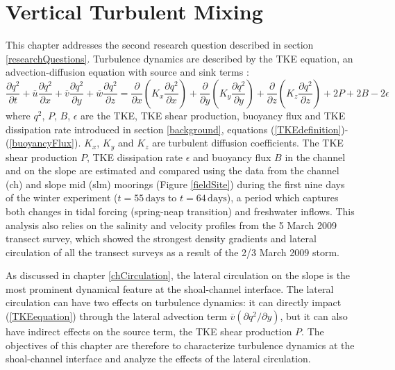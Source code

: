 \chapter{Vertical Turbulent Mixing}
\label{chTurbulence}

This chapter addresses the second research question described in section \ref{researchQuestions}. Turbulence dynamics are described by the TKE equation, an advection-diffusion equation with source and sink terms \parencite{Stacey:2012p5324}:
\begin{equation}
\label{TKEequation}
\frac{\partial q^2}{\partial t} + \overline{u}\frac{\partial q^2}{\partial x} +  \overline{v}\frac{\partial q^2}{\partial y} +  \overline{w}\frac{\partial q^2}{\partial z} = \frac{\partial}{\partial x} \left(K_x \frac{\partial q^2}{\partial x} \right) + \frac{\partial}{\partial y} \left(K_y \frac{\partial q^2}{\partial y} \right) + \frac{\partial}{\partial z} \left(K_z \frac{\partial q^2}{\partial z} \right) + 2P + 2B - 2\epsilon
\end{equation}
where $q^2$, $P$, $B$, $\epsilon$ are the TKE, TKE shear production, buoyancy flux and TKE dissipation rate introduced in section \ref{background}, equations (\ref{TKEdefinition})-(\ref{buoyancyFlux}). $K_x$, $K_y$ and $K_z$ are turbulent diffusion coefficients. The TKE shear production $P$, TKE dissipation rate $\epsilon$ and buoyancy flux $B$ in the channel and on the slope are estimated and compared using the data from the channel (ch) and slope mid (slm) moorings (Figure \ref{fieldSite}) during the first nine days of the winter experiment ($t=55\, \mathrm{days}$ to $t=64\, \mathrm{days}$), a period which captures both changes in tidal forcing (spring-neap transition) and freshwater inflows. This analysis also relies on the salinity and velocity profiles from the 5 March 2009 transect survey, which showed the strongest density gradients and lateral circulation of all the transect surveys as a result of the 2/3 March 2009 storm. 

As discussed in chapter \ref{chCirculation}, the lateral circulation on the slope is the most prominent dynamical feature at the shoal-channel interface.  The lateral circulation can have two effects on turbulence dynamics: it can directly impact (\ref{TKEequation}) through the lateral advection term $\overline{v}\left(\partial q^2 / \partial y \right)$, but it can also have indirect effects on the source term, the TKE shear production $P$. The objectives of this chapter are therefore to characterize turbulence dynamics at the shoal-channel interface and analyze the effects of the lateral circulation.
 

